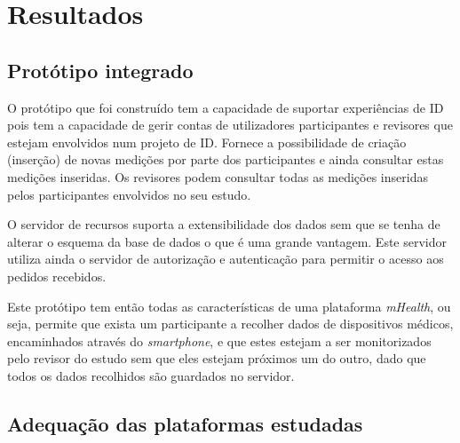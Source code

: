 \chapter{Resultados}
\section{Protótipo integrado}

O protótipo que foi construído tem a capacidade de suportar experiências de \gls{ID} pois tem a capacidade de gerir contas de utilizadores participantes e revisores que estejam envolvidos num projeto de \gls{ID}. Fornece a possibilidade de criação (inserção) de novas medições por parte dos participantes e ainda consultar estas medições inseridas. Os revisores podem consultar todas as medições inseridas pelos participantes envolvidos no seu estudo.\par
O servidor de recursos suporta a extensibilidade dos dados sem que se tenha de alterar o esquema da base de dados o que é uma grande vantagem. Este servidor utiliza ainda o servidor de autorização e autenticação para permitir o acesso aos pedidos recebidos. \par
Este protótipo tem então todas as características de uma plataforma \textit{mHealth}, ou seja, permite que exista um participante a recolher dados de dispositivos médicos, encaminhados através do \textit{smartphone}, e que estes estejam a ser monitorizados pelo revisor do estudo sem que eles estejam próximos um do outro, dado que todos os dados recolhidos são guardados no servidor.

\section{Adequação das plataformas estudadas}

